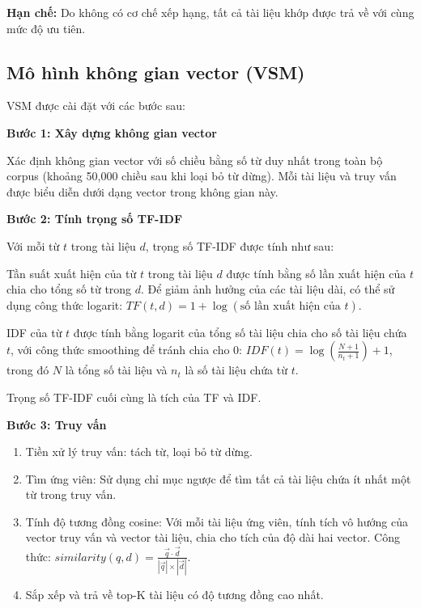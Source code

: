 \documentclass[../BTL.tex]{subfiles}
\begin{document}
\textbf{Hạn chế:} Do không có cơ chế xếp hạng, tất cả tài liệu khớp được trả về với cùng mức độ ưu tiên.


\subsection{Mô hình không gian vector (VSM)}

VSM được cài đặt với các bước sau:

\textbf{Bước 1: Xây dựng không gian vector}

Xác định không gian vector với số chiều bằng số từ duy nhất trong toàn bộ corpus (khoảng 50,000 chiều sau khi loại bỏ từ dừng). Mỗi tài liệu và truy vấn được biểu diễn dưới dạng vector trong không gian này.

\textbf{Bước 2: Tính trọng số TF-IDF}

Với mỗi từ $t$ trong tài liệu $d$, trọng số TF-IDF được tính như sau:

Tần suất xuất hiện của từ $t$ trong tài liệu $d$ được tính bằng số lần xuất hiện của $t$ chia cho tổng số từ trong $d$. Để giảm ảnh hưởng của các tài liệu dài, có thể sử dụng công thức logarit: $TF(t, d) = 1 + \log(\text{số lần xuất hiện của } t)$.

IDF của từ $t$ được tính bằng logarit của tổng số tài liệu chia cho số tài liệu chứa $t$, với công thức smoothing để tránh chia cho 0: $IDF(t) = \log\left(\frac{N + 1}{n_t + 1}\right) + 1$, trong đó $N$ là tổng số tài liệu và $n_t$ là số tài liệu chứa từ $t$.

Trọng số TF-IDF cuối cùng là tích của TF và IDF.

\textbf{Bước 3: Truy vấn}

\begin{enumerate}
    \item Tiền xử lý truy vấn: tách từ, loại bỏ từ dừng.
    
    \item Tìm ứng viên: Sử dụng chỉ mục ngược để tìm tất cả tài liệu chứa ít nhất một từ trong truy vấn.
    
    \item Tính độ tương đồng cosine: Với mỗi tài liệu ứng viên, tính tích vô hướng của vector truy vấn và vector tài liệu, chia cho tích của độ dài hai vector. Công thức: $similarity(q, d) = \frac{\vec{q} \cdot \vec{d}}{|\vec{q}| \times |\vec{d}|}$.
    
    \item Sắp xếp và trả về top-K tài liệu có độ tương đồng cao nhất.
\end{enumerate}
\end{document}
